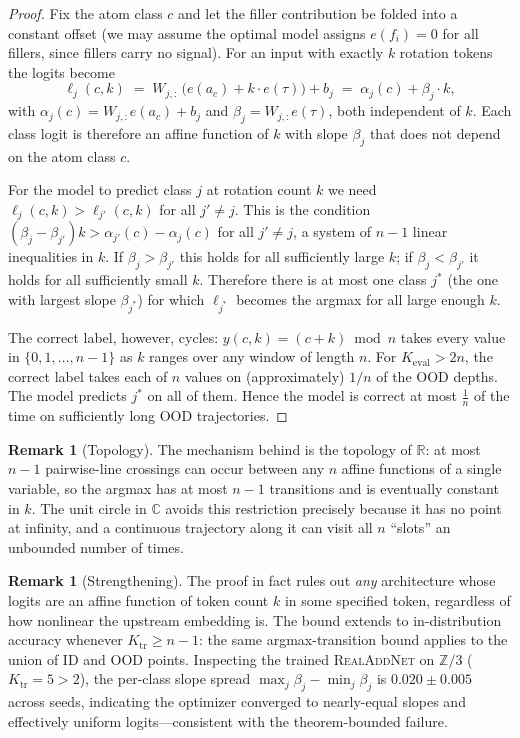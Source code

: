 \documentclass[11pt]{article}
\theoremstyle{definition}
\newtheorem{remark}[theorem]{Remark}
\newcommand{\R}{\mathbb{R}}
\newcommand{\C}{\mathbb{C}}
\newcommand{\Z}{\mathbb{Z}}
\begin{document}
\begin{proof}
Fix the atom class $c$ and let the filler contribution be folded into
a constant offset (we may assume the optimal model assigns
$e(f_i) = 0$ for all fillers, since fillers carry no signal). For an
input with exactly $k$ rotation tokens the logits become
\[
\ell_j(c, k) \;=\; W_{j, :}\,\bigl(e(a_c) + k \cdot e(\tau)\bigr) + b_j
\;=\; \alpha_j(c) + \beta_j \cdot k,
\]
with $\alpha_j(c) = W_{j,:} e(a_c) + b_j$ and
$\beta_j = W_{j,:} e(\tau)$, both independent of $k$. Each class
logit is therefore an affine function of $k$ with slope $\beta_j$
that does not depend on the atom class $c$.

For the model to predict class $j$ at rotation count $k$ we need
$\ell_j(c, k) > \ell_{j'}(c, k)$ for all $j' \neq j$. This is the
condition $(\beta_j - \beta_{j'}) k > \alpha_{j'}(c) - \alpha_j(c)$
for all $j' \neq j$, a system of $n-1$ linear inequalities in $k$.
If $\beta_j > \beta_{j'}$ this holds for all sufficiently large
$k$; if $\beta_j < \beta_{j'}$ it holds for all sufficiently small
$k$. Therefore there is at most one class $j^*$ (the one with
largest slope $\beta_{j^*}$) for which $\ell_{j^*}$ becomes the
argmax for all large enough $k$.

The correct label, however, cycles: $y(c, k) = (c + k) \bmod n$
takes every value in $\{0, 1, \ldots, n-1\}$ as $k$ ranges over any
window of length $n$. For $K_\text{eval} > 2n$, the
correct label takes each of $n$ values on (approximately) $1/n$ of
the OOD depths. The model predicts $j^*$ on all of them. Hence the
model is correct at most $\frac{1}{n}$ of the time on sufficiently
long OOD trajectories.
\end{proof}

\begin{remark}[Topology]
\label{rem:topology}
The mechanism behind  is the topology of
$\R$: at most $n-1$ pairwise-line crossings can occur between any
$n$ affine functions of a single variable, so the argmax has at
most $n-1$ transitions and is eventually constant in $k$. The
unit circle in $\C$ avoids this restriction precisely because it
has no point at infinity, and a continuous trajectory along it can
visit all $n$ ``slots'' an unbounded number of times.
\end{remark}

\begin{remark}[Strengthening]
The proof in fact rules out \emph{any} architecture whose logits
are an affine function of token count $k$ in some specified token,
regardless of how nonlinear the upstream embedding is. The bound
extends to in-distribution accuracy whenever
$K_\mathrm{tr} \geq n-1$: the same argmax-transition bound applies
to the union of ID and OOD points. Inspecting the trained
\textsc{RealAddNet} on $\Z/3$ ($K_\mathrm{tr} = 5 > 2$), the
per-class slope spread $\max_j \beta_j - \min_j \beta_j$ is
$0.020 \pm 0.005$ across seeds, indicating the optimizer converged
to nearly-equal slopes and effectively uniform logits---consistent
with the theorem-bounded failure.
\end{remark}
\end{document}
